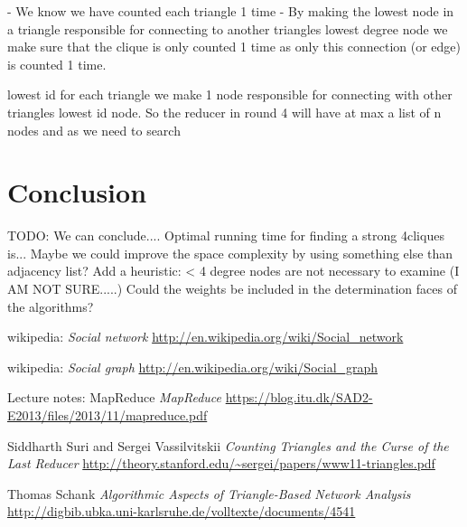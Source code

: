 \documentclass{article}
\begin{document}
- We know we have counted each triangle 1 time
- By making the lowest node in a triangle responsible for connecting to another triangles lowest degree node we make sure that the clique is only counted 1 time as only this connection (or edge) is counted 1 time.

lowest id
for each triangle we make 1 node responsible for connecting with other triangles lowest id node. So the reducer in round 4 will have at max a list of n nodes and as we need to search


\section{Conclusion}
TODO: We can conclude....
Optimal running time for finding a strong 4cliques is...
Maybe we could improve the space complexity by using something else than adjacency list?
Add a heuristic: < 4 degree nodes are not necessary to examine (I AM NOT SURE.....)
Could the weights be included in the determination faces of the algorithms?

\begin{thebibliography}{1}

    wikipedia:
    \emph{Social network}
    \url{http://en.wikipedia.org/wiki/Social_network}

    wikipedia:
    \emph{Social graph}
    \url{http://en.wikipedia.org/wiki/Social_graph}

    Lecture notes: MapReduce
    \emph{MapReduce}
    \url{https://blog.itu.dk/SAD2-E2013/files/2013/11/mapreduce.pdf}

    Siddharth Suri and Sergei Vassilvitskii
    \emph{Counting Triangles and the Curse of the Last Reducer}
    \url{http://theory.stanford.edu/~sergei/papers/www11-triangles.pdf}

    Thomas Schank
    \emph{Algorithmic Aspects of Triangle-Based Network Analysis}
    \url{http://digbib.ubka.uni-karlsruhe.de/volltexte/documents/4541}
    
\end{thebibliography}
\end{document}

